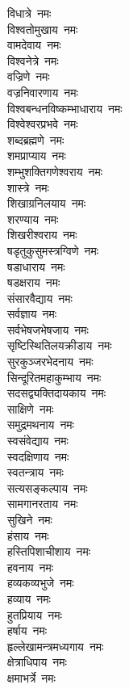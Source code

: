 \begin{multicols}{2}
\begin{flushleft}
विधात्रे~नमः\\
विश्वतोमुखाय~नमः\\
वामदेवाय~नमः\hfill{}\\
विश्वनेत्रे~नमः\\
वज्रिणे~नमः\\
वज्रनिवारणाय~नमः\\
विश्वबन्धनविष्कम्भाधाराय~नमः\\
विश्वेश्वरप्रभवे~नमः\\
शब्दब्रह्मणे~नमः\\
शमप्राप्याय~नमः\\
शम्भुशक्तिगणेश्वराय~नमः\\
शास्त्रे~नमः\\
शिखाग्रनिलयाय~नमः\hfill{}\\
शरण्याय~नमः\\
शिखरीश्वराय~नमः\\
षडृतुकुसुमस्त्रग्विणे~नमः\\
षडाधाराय~नमः\\
षडक्षराय~नमः\\
संसारवैद्याय~नमः\\
सर्वज्ञाय~नमः\\
सर्वभेषजभेषजाय~नमः\\
सृष्टिस्थितिलयक्रीडाय~नमः\\
सुरकुञ्जरभेदनाय~नमः\hfill{}\\
सिन्दूरितमहाकुम्भाय~नमः\\
सदसद्व्यक्तिदायकाय~नमः\\
साक्षिणे~नमः\\
समुद्रमथनाय~नमः\\
स्वसंवेद्याय~नमः\\
स्वदक्षिणाय~नमः\\
स्वतन्त्राय~नमः\\
सत्यसङ्कल्पाय~नमः\\
सामगानरताय~नमः\\
सुखिने~नमः\hfill{}\\
हंसाय~नमः\\
हस्तिपिशाचीशाय~नमः\\
हवनाय~नमः\\
हव्यकव्यभुजे~नमः\\
हव्याय~नमः\\
हुतप्रियाय~नमः\\
हर्षाय~नमः\\
हृल्लेखामन्त्रमध्यगाय~नमः\\
क्षेत्राधिपाय~नमः\\
क्षमाभर्त्रे~नमः\hfill{}\\

\end{flushleft}
\end{multicols}
